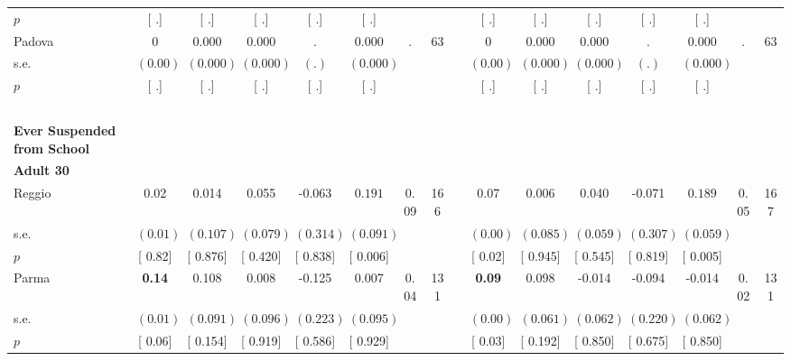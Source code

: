 \begin{longtable}{L{8em} c c c c c c c p{1em} c c c c c c c}
\quad \quad \quad \quad $ p$ & [        .] & [        .] & [        .] & [        .] & [        .] & & & & [        .] & [        .] & [        .] & [        .] & [        .] & &  \\[1em]
\quad \quad \quad Padova& 0 &     0.000 &     0.000 &         . &     0.000 &         . &        63 & & 0 &     0.000 &     0.000 &         . &     0.000 &         . &        63  \\*
\quad \quad \quad \quad s.e.& $ (     0.00)$ & $ (    0.000)$ & $ (    0.000)$ & $ (        .)$ & $ (    0.000)$ & & & & $ (     0.00)$ & $ (    0.000)$ & $ (    0.000)$ & $ (        .)$ & $ (    0.000)$ & &  \\*
\quad \quad \quad \quad $ p$ & [        .] & [        .] & [        .] & [        .] & [        .] & & & & [        .] & [        .] & [        .] & [        .] & [        .] & &  \\[1em]
~\\[1em]
\textbf{Ever Suspended from School} \\*
\quad \quad \textbf{Adult 30} & & & & & & & & & & & & & & & \\* 
\quad \quad \quad Reggio& 0.02 &     0.014 &     0.055 &    -0.063 & $ \mathbf{    0.191}$ &      0.09 &       166 & & 0.07 &     0.006 &     0.040 &    -0.071 & $ \mathbf{    0.189}$ &      0.05 &       167  \\*
\quad \quad \quad \quad s.e.& $ (     0.01)$ & $ (    0.107)$ & $ (    0.079)$ & $ (    0.314)$ & $ (    0.091)$ & & & & $ (     0.00)$ & $ (    0.085)$ & $ (    0.059)$ & $ (    0.307)$ & $ (    0.059)$ & &  \\*
\quad \quad \quad \quad $ p$ & [     0.82] & [    0.876] & [    0.420] & [    0.838] & [    0.006] & & & & [     0.02] & [    0.945] & [    0.545] & [    0.819] & [    0.005] & &  \\[1em]
\quad \quad \quad Parma& \textbf{     0.14} &     0.108 &     0.008 &    -0.125 &     0.007 &      0.04 &       131 & & \textbf{     0.09} &     0.098 &    -0.014 &    -0.094 &    -0.014 &      0.02 &       131  \\*
\quad \quad \quad \quad s.e.& $ (     0.01)$ & $ (    0.091)$ & $ (    0.096)$ & $ (    0.223)$ & $ (    0.095)$ & & & & $ (     0.00)$ & $ (    0.061)$ & $ (    0.062)$ & $ (    0.220)$ & $ (    0.062)$ & &  \\*
\quad \quad \quad \quad $ p$ & [     0.06] & [    0.154] & [    0.919] & [    0.586] & [    0.929] & & & & [     0.03] & [    0.192] & [    0.850] & [    0.675] & [    0.850] & &  \\[1em]

\end{longtable}
